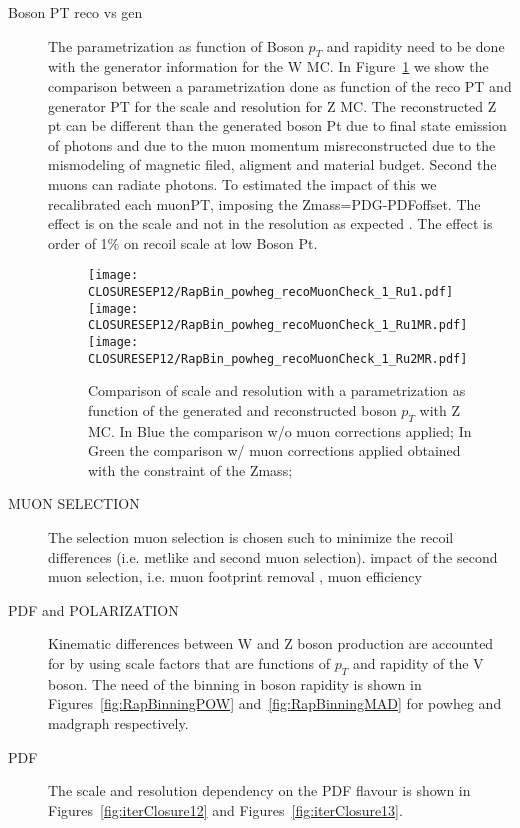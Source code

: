 \documentclass[41pt,a4paper,oneside]{report}
\begin{document}
\begin{description}

\item[Boson PT reco vs gen] The parametrization as function of Boson $p_{T}$ and rapidity need to be done with the generator information for the W MC.
In Figure~\ref{fig:RecoGenPtBinning} we show the comparison between a parametrization done as function of the reco PT and generator PT for the scale and resolution for Z MC. 
The reconstructed Z pt can be different than the generated boson Pt due to final state emission of photons and due to the muon momentum misreconstructed due to the mismodeling of magnetic filed, aligment and material budget. Second the muons can radiate photons.
To estimated the impact of this we recalibrated each muonPT, imposing the Zmass=PDG-PDFoffset.
The effect is on the scale and not in the resolution as expected . The effect is order of 1\% on recoil scale at low Boson Pt.

\begin{figure}[h!]
  \begin{center}
    \texttt{[image: CLOSURESEP12/RapBin\_powheg\_recoMuonCheck\_1\_Ru1.pdf]}
    \texttt{[image: CLOSURESEP12/RapBin\_powheg\_recoMuonCheck\_1\_Ru1MR.pdf]}
    \texttt{[image: CLOSURESEP12/RapBin\_powheg\_recoMuonCheck\_1\_Ru2MR.pdf]}
    \caption{Comparison of scale and resolution with a parametrization as function of the generated and reconstructed boson $p_{T}$ with Z MC.
      In Blue the comparison w/o muon corrections applied; In Green the comparison w/ muon corrections applied obtained with the constraint of the Zmass; 
    }
    \label{fig:RecoGenPtBinning}
  \end{center}
\end{figure}

\item[MUON SELECTION] The selection muon selection is chosen such to minimize the recoil differences (i.e. metlike and second muon selection).
impact of the second muon selection, i.e. muon footprint removal , muon efficiency

\item[PDF and POLARIZATION] Kinematic differences between W and Z boson production are accounted for by using scale factors that are functions of $p_{T}$ and rapidity of the V boson. The need of the binning in boson rapidity is shown in Figures~\ref{fig:RapBinningPOW} and~\ref{fig:RapBinningMAD} for powheg and madgraph respectively.

\item[PDF] The scale and resolution dependency on the PDF flavour is shown in Figures~\ref{fig:iterClosure12} and Figures~\ref{fig:iterClosure13}. 

\end{description}
\end{document}
